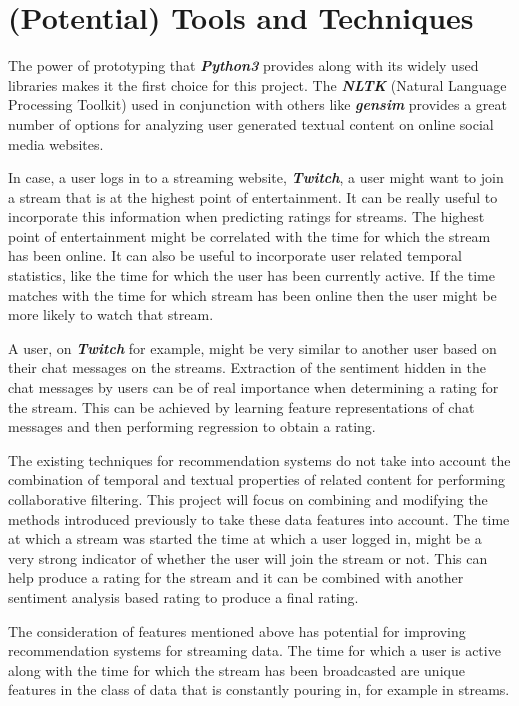 \documentclass[11pt]{article}
\begin{document}
\section{(Potential) Tools and Techniques}
\par
The power of prototyping that \textbf{\textit{Python3}} provides along with its widely used libraries makes it the first choice for this project. The \textbf{\textit{NLTK}} (Natural Language Processing Toolkit) used in conjunction with others like \textbf{\textit{gensim}} provides a great number of options for analyzing user generated textual content on online social media websites.
\par
In case, a user logs in to a streaming website, \textbf{\textit{Twitch}}, a user might want to join a stream that is at the highest point of entertainment. It can be really useful to incorporate this information when predicting ratings for streams. The highest point of entertainment might be correlated with the time for which the stream has been online. It can also be useful to incorporate user related temporal statistics, like the time for which the user has been currently active. If the time matches with the time for which stream has been online then the user might be more likely to watch that stream.
\par
A user, on \textbf{\textit{Twitch}} for example, might be very similar to another user based on their chat messages on the streams. Extraction of the sentiment hidden in the chat messages by users can be of real importance when determining a rating for the stream. This can be achieved by learning feature representations of chat messages and then performing regression to obtain a rating.
\par
The existing techniques for recommendation systems do not take into account the combination of temporal and textual properties of related content for performing collaborative filtering. This project will focus on combining and modifying the methods introduced previously to take these data features into account. The time at which a stream was started the time at which a user logged in, might be a very strong indicator of whether the user will join the stream or not. This can help produce a rating for the stream and it can be combined with another sentiment analysis based rating to produce a final rating.
\par
The consideration of features mentioned above has potential for improving recommendation systems for streaming data. The time for which a user is active along with the time for which the stream has been broadcasted are unique features in the class of data that is constantly pouring in, for example in streams.
\end{document}
